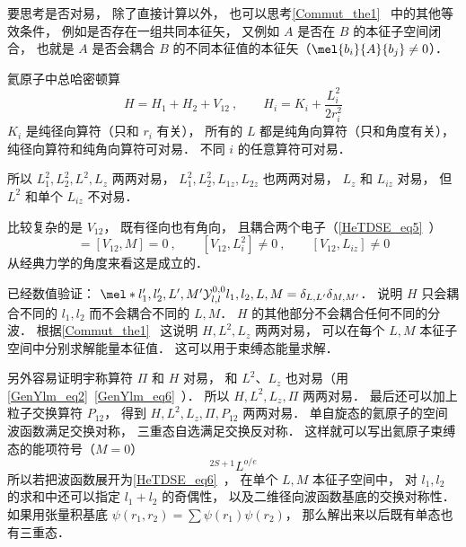
\begin{issues}
\issueDraft
\end{issues}

要思考是否对易， 除了直接计算以外， 也可以思考\autoref{Commut_the1}~ 中的其他等效条件， 例如是否存在一组共同本征矢， 又例如 $A$ 是否在 $B$ 的本征子空间闭合， 也就是 $A$ 是否会耦合 $B$ 的不同本征值的本征矢（$\mel{b_i}{A}{b_j} \ne 0$）．

氦原子中总哈密顿算
\begin{equation}
H = H_1 + H_2 + V_{12}~,
\qquad H_i = K_i + \frac{L_i^2}{2r_i^2}
\end{equation}
$K_i$ 是纯径向算符（只和 $r_i$ 有关）， 所有的 $L$ 都是纯角向算符（只和角度有关）， 纯径向算符和纯角向算符可对易． 不同 $i$ 的任意算符可对易．

所以 $L_1^2, L_2^2, L^2, L_z$ 两两对易， $L_1^2, L_2^2, L_{1z}, L_{2z}$ 也两两对易， $L_z$ 和 $L_{iz}$ 对易， 但 $L^2$ 和单个 $L_{iz}$ 不对易．

比较复杂的是 $V_{12}$， 既有径向也有角向， 且耦合两个电子（\autoref{HeTDSE_eq5}~）
\begin{equation}
[V_{12}, L^2] = [V_{12}, M] = 0~,
\qquad
[V_{12}, L_i^2] \ne 0~,
\qquad
[V_{12}, L_{iz}] \ne 0
\end{equation}
从经典力学的角度来看这是成立的．

已经数值验证： $\mel*{l'_1,l'_2,L',M'}{\mathcal Y_{l,l}^{0,0}}{l_1,l_2,L,M} = \delta_{L,L'}\delta_{M,M'}$． 说明 $H$ 只会耦合不同的 $l_1,l_2$ 而不会耦合不同的 $L,M$． $H$ 的其他部分不会耦合任何不同的分波． 根据\autoref{Commut_the1}~ 这说明 $H,L^2,L_z$ 两两对易， 可以在每个 $L,M$ 本征子空间中分别求解能量本征值． 这可以用于束缚态能量求解．

另外容易证明宇称算符 $\Pi$ 和 $H$ 对易， 和 $L^2$、$L_z$ 也对易（用\autoref{GenYlm_eq2}~\autoref{GenYlm_eq6}~）． 所以 $H,L^2,L_z,\Pi$ 两两对易． 最后还可以加上粒子交换算符 $P_{12}$， 得到 $H,L^2,L_z,\Pi, P_{12}$ 两两对易． 单自旋态的氦原子的空间波函数满足交换对称， 三重态自选满足交换反对称． 这样就可以写出氦原子束缚态的能项符号（$M=0$）
\begin{equation}
^{2S+1}L^{o/e}
\end{equation}
所以若把波函数展开为\autoref{HeTDSE_eq6}~， 在单个 $L,M$ 本征子空间中， 对 $l_1,l_2$ 的求和中还可以指定 $l_1+l_2$ 的奇偶性， 以及二维径向波函数基底的交换对称性． 如果用张量积基底 $\psi(r_1,r_2) = \sum \psi(r_1)\psi(r_2)$， 那么解出来以后既有单态也有三重态．
